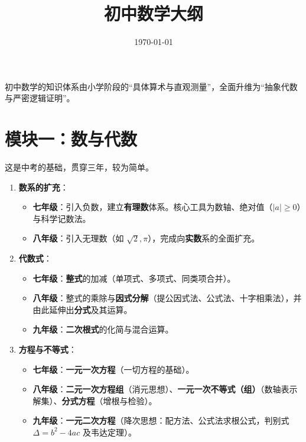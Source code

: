\documentclass[11pt,a4paper]{ctexart}
\title{\textbf{\Huge 初中数学大纲}}
\date{\today}
\begin{document}
\maketitle
\thispagestyle{empty}

初中数学的知识体系由小学阶段的“具体算术与直观测量”，全面升维为“抽象代数与严密逻辑证明”。

\section{模块一：数与代数}
这是中考的基础，贯穿三年，较为简单。

\begin{enumerate}[label=\textbf{\thesection.\arabic*}]
    \item \textbf{数系的扩充}：
    \begin{itemize}
        \item \textbf{七年级}：引入负数，建立\textbf{有理数}体系。核心工具为数轴、绝对值（$|a| \ge 0$）与科学记数法。
        \item \textbf{八年级}：引入无理数（如 $\sqrt{2}, \pi$），完成向\textbf{实数}系的全面扩充。
    \end{itemize}
    
    \item \textbf{代数式}：
    \begin{itemize}
        \item \textbf{七年级}：\textbf{整式}的加减（单项式、多项式、同类项合并）。
        \item \textbf{八年级}：整式的乘除与\textbf{因式分解}（提公因式法、公式法、十字相乘法），并由此延伸出\textbf{分式}及其运算。
        \item \textbf{九年级}：\textbf{二次根式}的化简与混合运算。
    \end{itemize}
    
    \item \textbf{方程与不等式}：
    \begin{itemize}
        \item \textbf{七年级}：\textbf{一元一次方程}（一切方程的基础）。
        \item \textbf{八年级}：\textbf{二元一次方程组}（消元思想）、\textbf{一元一次不等式（组）}（数轴表示解集）、\textbf{分式方程}（增根与检验）。
        \item \textbf{九年级}：\textbf{一元二次方程}（降次思想：配方法、公式法求根公式，判别式 $\Delta = b^2 - 4ac$ 及韦达定理）。
    \end{itemize}
\end{enumerate}
\end{document}

